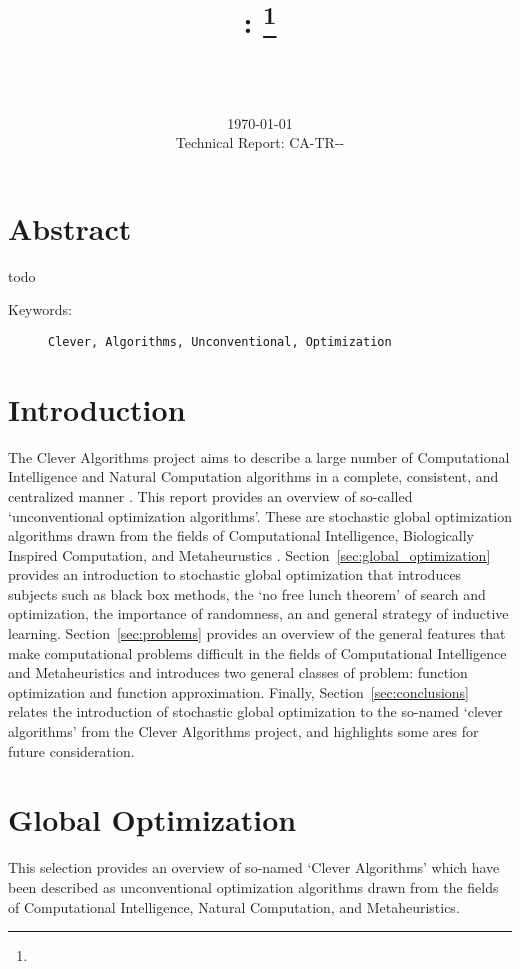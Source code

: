 \documentclass[a4paper, 11pt]{article}
\title{{\myreporttitle}: {\myreportsubtitle}\footnote{\myreportlicense}}
\author{\myreportauthor\\{\myreportemail}\\\small\myreportproject}
\date{\today\\{\small{Technical Report: CA-TR-{\myreportdate}-\myreportversion}}}
\begin{document}
\maketitle

\section*{Abstract} 
todo

\begin{description}
	\item[Keywords:] {\small\texttt{Clever, Algorithms, Unconventional, Optimization}}
\end{description} 

\section{Introduction}
\label{sec:introduction}
The Clever Algorithms project aims to describe a large number of Computational Intelligence and Natural Computation algorithms in a complete, consistent, and centralized manner \cite{Brownlee2010}.
This report provides an overview of so-called `unconventional optimization algorithms'. These are stochastic global optimization algorithms drawn from the fields of Computational Intelligence, Biologically Inspired Computation, and Metaheurustics \cite{Brownlee2010c}.
Section~\ref{sec:global_optimization} provides an introduction to stochastic global optimization that introduces subjects such as black box methods, the `no free lunch theorem' of search and optimization, the importance of randomness, an and general strategy of inductive learning. 
Section~\ref{sec:problems} provides an overview of the general features that make computational problems difficult in the fields of Computational Intelligence and Metaheuristics and introduces two general classes of problem: function optimization and function approximation.
Finally, Section~\ref{sec:conclusions} relates the introduction of stochastic global optimization to the so-named `clever algorithms' from the Clever Algorithms project, and highlights some ares for future consideration.

% 
% 
\section{Global Optimization}
This selection provides an overview of so-named `Clever Algorithms' which have been described as unconventional optimization algorithms drawn from the fields of Computational Intelligence, Natural Computation, and Metaheuristics. 
\end{document}
